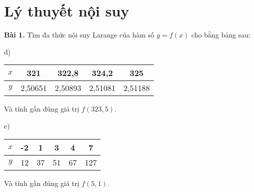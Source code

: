 \chapter{Lý thuyết nội suy}
\textbf{\color{blue}Bài 1.} Tìm đa thức nội suy Larange của hàm số $y=f(x)$ cho bằng bảng sau:\par
\begin{multicols}{2}
d)\begin{center}\begin{tabular}{|c|c|c|c|c|}
	\hline
	$x$&321&322,8&324,2&325\\ \hline
	$y$&2,50651&2,50893&2,51081&2,51188\\ \hline
\end{tabular}\end{center}
Và tính gần đúng giá trị $f(323,5)$.\par
e)\begin{center}\begin{tabular}{|c|c|c|c|c|c|}
	\hline
	$x$&-2&1&3&4&7\\ \hline
	$y$&12&37&51&67&127\\ \hline
\end{tabular}\end{center}
Và tính gần đúng giá trị $f(5,1)$.\par
\end{multicols}

